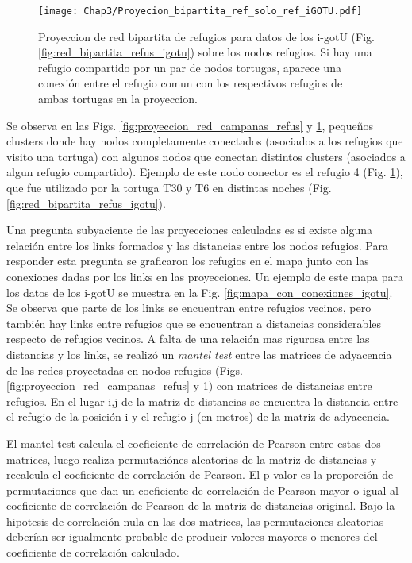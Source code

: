 \begin{figure}[ht]
    \begin{center}
        \texttt{[image: Chap3/Proyecion\_bipartita\_ref\_solo\_ref\_iGOTU.pdf]}
        \caption[Proyeccion  de red bipartita de refugios para datos de los i-gotU en nodos refugios.]{Proyeccion  de red bipartita de refugios para datos de los i-gotU (Fig. \ref{fig:red_bipartita_refus_igotu}) sobre los nodos refugios. Si hay una refugio compartido por un par de nodos tortugas, aparece una conexión entre el refugio comun con los respectivos refugios de ambas tortugas en la proyeccion. } 
        \label{fig:proyeccion_red_igotu_refus}
        
        \end{center}
\end{figure} 
Se observa en las Figs. \ref{fig:proyeccion_red_campanas_refus} y \ref{fig:proyeccion_red_igotu_refus}, pequeños clusters donde hay nodos completamente conectados (asociados a los refugios que visito una tortuga) con algunos nodos que conectan distintos clusters (asociados a algun refugio compartido). Ejemplo de este nodo conector es el refugio 4 (Fig. \ref{fig:proyeccion_red_igotu_refus}), que fue utilizado por la tortuga T30 y T6 en distintas noches (Fig. \ref{fig:red_bipartita_refus_igotu}). 

Una pregunta subyaciente de las proyecciones calculadas es si existe alguna relación entre los links formados y las distancias entre los nodos refugios. Para responder esta pregunta se graficaron los refugios en el mapa junto con las conexiones dadas por los links en las proyecciones. Un ejemplo de este mapa para los datos de los i-gotU se muestra en la Fig. \ref{fig:mapa_con_conexiones_igotu}. Se observa que parte de los links se encuentran entre refugios vecinos, pero también hay links entre refugios que se encuentran a distancias considerables respecto de refugios vecinos. A falta de una relación mas rigurosa entre las distancias y los links, se realizó un \textit{mantel test} \cite{MantelTest} entre las matrices de adyacencia de las redes proyectadas en nodos refugios (Figs. \ref{fig:proyeccion_red_campanas_refus} y \ref{fig:proyeccion_red_igotu_refus}) con matrices de distancias entre refugios. En el lugar i,j de la matriz de distancias se encuentra la distancia entre el refugio  de la posición i y el refugio j (en metros) de la matriz de adyacencia. 

El mantel test calcula el coeficiente de correlación de Pearson entre estas dos matrices, luego realiza permutaciónes aleatorias de la matriz de distancias y recalcula el coeficiente de correlación de Pearson. El p-valor es la proporción de permutaciones que dan un coeficiente de correlación de Pearson mayor o igual al coeficiente de correlación de Pearson de la matriz de distancias original. Bajo la hipotesis de correlación nula en las dos matrices, las permutaciones aleatorias deberían ser igualmente probable de producir valores mayores o menores del coeficiente de correlación calculado. 


